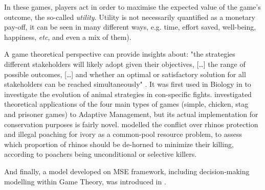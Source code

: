\documentclass[12pt,a4paper]{article}
\begin{document}
In these games, players act in order to maximise the expected value of the game's outcome, the so-called \textit{utility}.
Utility is not necessarily quantified as a monetary pay-off, it can be seen in many different ways, e.g. time, effort saved, well-being, happiness, \textit{etc}, and even a mix of them).

A game theoretical perspective can provide insights about: "the strategies different stakeholders will likely adopt given their objectives, [\dots] the range of possible outcomes, [\dots] and whether an optimal or satisfactory solution for all stakeholders can be reached simultaneously" \citep{COLYVAN20111246}.
It was first used in Biology in \cite{maynard1973logic} to investigate the evolution of animal strategies in con-specific fights.
\cite{COLYVAN20111246} investigated theoretical applications of the four main types of games (simple, chicken, stag and prisoner games) to Adaptive Management, but its actual implementation for conservation purposes is fairly novel. %
\cite{glynatsi2018evolutionary} modelled the conflict over rhinos protection and illegal poaching for ivory as a common-pool resource problem, to assess which proportion of rhinos should be de-horned to minimize their killing, according to poachers being unconditional or selective killers. %

And finally, a model developed on MSE framework, including decision-making modelling within Game Theory, was introduced in \cite{duthie2018}.
\end{document}
